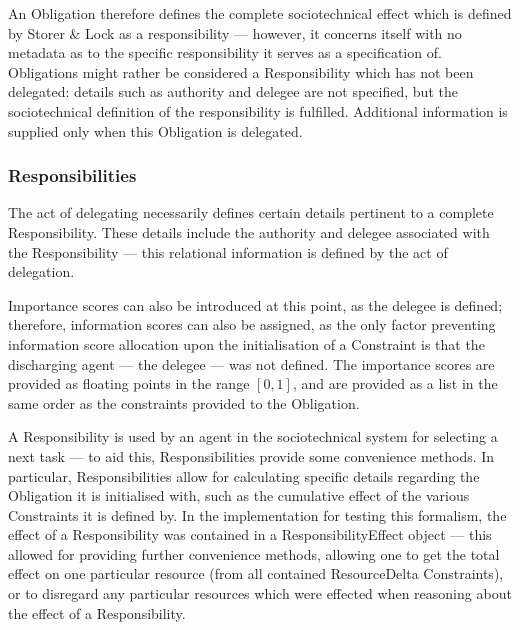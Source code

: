 An Obligation therefore defines the complete sociotechnical effect which is defined by Storer \& Lock as a responsibility --- however, it concerns itself with no metadata as to the specific responsibility it serves as a specification of. Obligations might rather be considered a Responsibility which has not been delegated: details such as authority and delegee are not specified, but the sociotechnical definition of the responsibility is fulfilled. Additional information is supplied only when this Obligation is delegated.

\subsubsection{Responsibilities}  %
The act of delegating necessarily defines certain details pertinent to a complete Responsibility. These details include the authority and delegee associated with the Responsibility --- this relational information is defined by the act of delegation.\par

Importance scores can also be introduced at this point, as the delegee is defined; therefore, information scores can also be assigned, as the only factor preventing information score allocation upon the initialisation of a Constraint is that the discharging agent --- the delegee --- was not defined. The importance scores are provided as floating points in the range \([0,1]\), and are provided as a list in the same order as the constraints provided to the Obligation.\par

A Responsibility is used by an agent in the sociotechnical system for selecting a next task --- to aid this, Responsibilities provide some convenience methods. In particular, Responsibilities allow for calculating specific details regarding the Obligation it is initialised with, such as the cumulative effect of the various Constraints it is defined by. In the implementation for testing this formalism, the effect of a Responsibility was contained in a ResponsibilityEffect object --- this allowed for providing further convenience methods, allowing one to get the total effect on one particular resource (from all contained ResourceDelta Constraints), or to disregard any particular resources which were effected when reasoning about the effect of a Responsibility.\par

